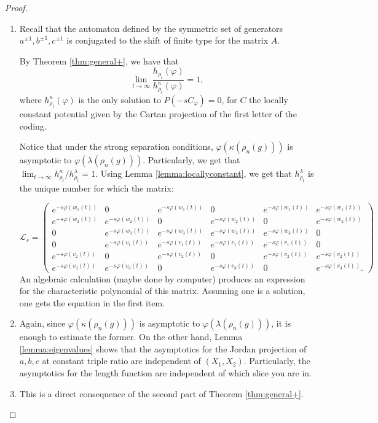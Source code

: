\documentclass[10pt,a4paper]{amsart}
\begin{document}
\begin{proof}
\begin{enumerate}
    \item 
 Recall that the automaton defined by the symmetric set of generators $a^{\pm 1}, b^{\pm 1}, c^{\pm 1}$ is conjugated to the shift of finite type for the matrix $A$. 

 By Theorem \ref{thm:general+}, we have that $$\lim_{t \to \infty} \frac{h_{\rho_t}(\varphi)}{h_{\rho_t}^\kappa(\varphi)} = 1,$$
 where $h_{\rho_t}^\kappa(\varphi)$ is the only solution to $P(-sC_\varphi) = 0$, for $C$ the locally constant potential given by the Cartan projection of the first letter of the coding. 
    
 Notice that under the strong separation conditions, $\varphi (\kappa (\rho_n (g)))$ is asymptotic to $\varphi (\lambda (\rho_n (g)))$.
 Particularly, we get that $\lim_{t \to \infty} h_{\rho_t}^\kappa/h_{\rho_t}^\lambda = 1$.
 Using Lemma \ref{lemma:locallyconstant}, we get that $h_{\rho_t}^\lambda$ is the unique number for which the matrix:

 $$\mathcal{L}_s = 
 \begin{pmatrix}
 e^{- s \varphi (w_1 (t))} & 0 & e^{- s \varphi (w_1 (t))} & 0 & e^{- s \varphi (w_1 (t))} & e^{- s \varphi (w_1 (t))}\\
 e^{-s \varphi (w_2 (t))} & e^{-s \varphi (w_2 (t))} & 0 & e^{-s \varphi (w_2 (t))} & 0 & e^{-s \varphi (w_2 (t))}\\
   0 & e^{-s \varphi (w_3 (t))} & e^{-s \varphi (w_3 (t))} & e^{-s \varphi (w_3 (t))} & e^{-s \varphi (w_3 (t))} & 0\\
   0 & e^{-s \varphi (v_1 (t))} & e^{-s \varphi (v_1 (t))} & e^{-s \varphi (v_1 (t))} & e^{-s \varphi (v_1 (t))} & 0\\
 e^{-s \varphi (v_2 (t))} & 0 & e^{-s \varphi (v_2 (t))} & 0 & e^{-s \varphi (v_2 (t))} & e^{-s \varphi (v_2 (t))}\\
 e^{-s \varphi (v_3 (t))} & e^{-s \varphi (v_3 (t))}  & 0 & e^{-s \varphi (v_3 (t))}  & 0 & e^{-s \varphi (v_3 (t))} .
 \end{pmatrix}
 $$
 An algebraic calculation (maybe done by computer) produces an expression for the characteristic polynomial of this matrix.
 Assuming one is a solution, one gets the equation in the first item.
 
      \item Again, since $\varphi (\kappa (\rho_n (g)))$ is asymptotic to $\varphi (\lambda (\rho_n (g)))$, it is enough to estimate the former.
 On the other hand, Lemma \ref{lemma:eigenvalues} shows that the asymptotics for the Jordan projection of $a,b,c$ at constant triple ratio are independent of $(X_1, X_2)$.
 Particularly, the asymptotics for the length function are independent of which slice you are in.
      
   \item This is a direct consequence of the second part of Theorem \ref{thm:general+}.
\end{enumerate}
\end{proof}
\end{document}

